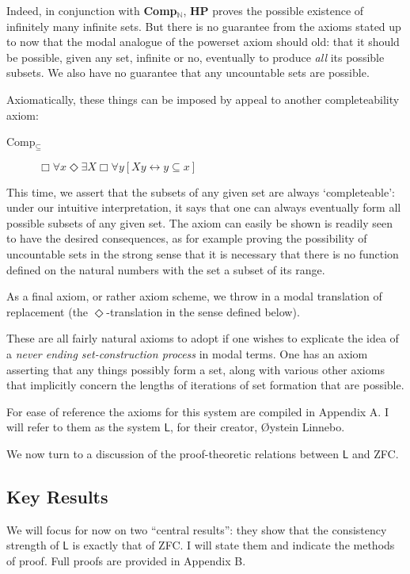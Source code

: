 \documentclass{article}
\begin{document}
Indeed, in conjunction with {\bf Comp$_\mathbb{N}$}, 
{\bf HP} proves the possible existence of infinitely many
infinite sets. But there is no guarantee from the axioms stated up to now that 
the modal analogue of the powerset axiom should old: that it should be possible, 
given any set, infinite or no, eventually to produce \emph{all} its possible subsets. 
We also have no guarantee that any uncountable sets are possible.

Axiomatically, these things can be imposed by appeal to another completeability axiom:
\begin{description}
    \item[Comp$_\subseteq$]
    $\Box \forall x \Diamond \exists X \Box \forall y[ Xy \leftrightarrow y \subseteq x]$
\end{description}
This time, we assert that the subsets of any given set are always `completeable': 
under our intuitive interpretation, 
it says that one can always eventually form all possible subsets of any given set. 
The axiom can easily be shown is readily seen to have the desired consequences, as 
for example proving the possibility of uncountable sets in the strong sense that 
it is necessary that there is no function defined on the natural numbers with the set 
a subset of its range.

As a final axiom, or rather axiom scheme, we throw in a modal 
translation of replacement (the $\Diamond$-translation in the sense defined below).

These are all fairly natural axioms to adopt if one wishes to explicate the idea 
of a \emph{never ending set-construction process} in modal terms. One has an axiom 
asserting that any things possibly form a set, along with various other axioms 
that implicitly concern the lengths of iterations of set formation that are possible.

For ease of reference the axioms 
for this system are compiled in Appendix A. I will refer to them as the system $\mathsf{L}$,
for their creator, \O ystein Linnebo.

We now turn to a discussion of the proof-theoretic relations between $\mathsf{L}$
and ZFC. 
\subsection{Key Results}
We will focus for now on two ``central results'': they show that the consistency 
strength of $\mathsf{L}$ is exactly that of ZFC. I will state them and indicate the methods of proof. 
Full proofs are provided in Appendix B. 
\end{document}
